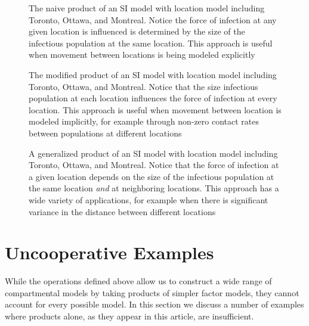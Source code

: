 \documentclass[pdflatex,sn-basic]{sn-jnl}%
\theoremstyle{definition}
\begin{document}
\FloatBarrier

\begin{figure}
    \centering
    
    \caption{The naive product of an SI model with location model including Toronto, Ottawa, and Montreal. Notice the force of infection at any given location is influenced is determined by the size of the infectious population at the same location. This approach is useful when movement between locations is being modeled explicitly}
    \label{fig:spat_n}
\end{figure}

\begin{figure}
    \centering
    
    \caption{The modified product of an SI model with location model including Toronto, Ottawa, and Montreal. Notice that the size infectious population at each location influences the force of infection at every location. This approach is useful when movement between location is modeled implicitly, for example through non-zero contact rates between populations at different locations}
    \label{fig:spat_m}
\end{figure}

\begin{figure}
    \centering
    
    \caption{A generalized product of an SI model with location model including Toronto, Ottawa, and Montreal. Notice that the force of infection at a given location depends on the size of the infectious population at the same location \textit{and} at neighboring locations. This approach has a wide variety of applications, for example when there is significant variance in the distance between different locations}
    \label{fig:spat_g}
\end{figure}

\FloatBarrier

\section{Uncooperative Examples}\label{unco}
While the operations defined above allow us to construct a wide range of compartmental models by taking products of simpler factor models, they cannot account for every possible model. In this section we discuss a number of examples where products alone, as they appear in this article, are insufficient.
\end{document}
